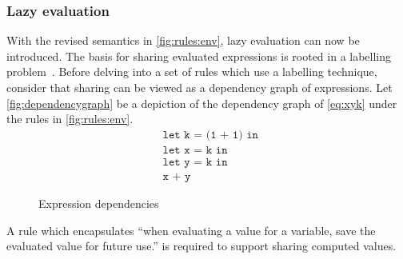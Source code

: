 \subsubsection{Lazy evaluation}
With the revised semantics in \autoref{fig:rules:env}, lazy evaluation can now be introduced.
The basis for sharing evaluated expressions is rooted in a labelling problem~\cite{levy1988sharing}.
Before delving into a set of rules which use a labelling technique, consider that sharing can be viewed as a dependency graph of expressions.
Let \autoref{fig:dependencygraph} be a depiction of the dependency graph of \autoref{eq:xyk} under the rules in \autoref{fig:rules:env}.
\begin{align}
  &\texttt{let k = (1 + 1) in }\label{eq:xyk}\\
  &\texttt{let x = k in }\tag*{}\\
  &\texttt{let y = k in }\tag*{}\\
  &\texttt{x + y}\tag*{}
\end{align}
\begin{figure}[ht]
  \centering
  \caption{Expression dependencies}
  \label{fig:dependencygraph}
\end{figure}
A rule which encapsulates ``when evaluating a value for a variable, save the evaluated value for future use.'' is required to support sharing computed values.
\begin{figure}[ht]
  \begin{mdframed}
    \begin{prooftree}
    \end{prooftree}
  \end{mdframed}
  \caption{}
  \label{fig:eval:share}
\end{figure}
